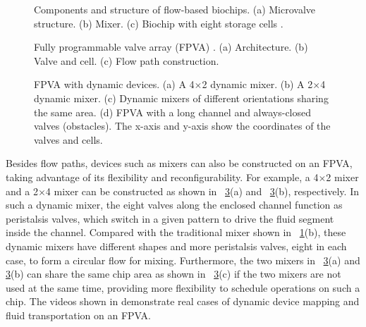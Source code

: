 \begin{figure}[t]
{\figurefontsize
\centering

\caption{Components and structure of flow-based biochips. (a)
Microvalve structure. (b) Mixer. (c) Biochip with eight
storage cells \cite{AminTA09}.}
\label{fig:valve_mixer_storage}
}
\end{figure}

\begin{figure}[t]
{\figurefontsize
\centering

\caption{Fully programmable valve array (FPVA) \cite{matrix11}.
(a) Architecture. (b) Valve and cell. (c) Flow path construction. }
\label{fig:archi}
}
\end{figure}

\begin{figure}[t]
{\figurefontsize
\centering

\caption{FPVA with dynamic devices. (a) A 4$\times$2 dynamic mixer.
(b) A 2$\times$4 dynamic mixer. (c) Dynamic mixers of different orientations
sharing the same area. (d) FPVA with a long channel and always-closed
valves (obstacles). The x-axis and y-axis show the coordinates of the valves and
cells.}
\label{fig:dynamic_devices}
}
\end{figure}


Besides flow paths, devices such as mixers can also be constructed on 
an FPVA, taking advantage of its flexibility and reconfigurability.
For example, a 4$\times$2 mixer and a 2$\times$4 mixer can be constructed as
shown in 
\figname~\ref{fig:dynamic_devices}(a) and \figname~\ref{fig:dynamic_devices}(b),
respectively. In such a dynamic mixer, the eight valves along the enclosed channel 
function as peristalsis valves, which switch in a given pattern 
to drive the fluid segment inside the channel. Compared with the
traditional mixer shown in \figname~\ref{fig:valve_mixer_storage}(b), these dynamic
mixers have different shapes and more peristalsis valves, eight in each case, to
form a 
circular flow for mixing.
Furthermore, the two mixers in 
\figname~\ref{fig:dynamic_devices}(a) and \ref{fig:dynamic_devices}(b)
can share the same chip area as shown in \figname~\ref{fig:dynamic_devices}(c)
if the two mixers are not used at the same time, providing more
flexibility to schedule operations on such a chip.
The videos shown in \cite{PMD_mixing, PMD_transportation} demonstrate
real cases of dynamic device mapping and fluid transportation on an FPVA.

